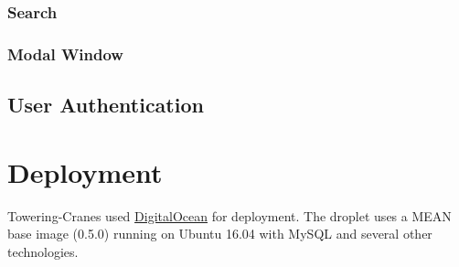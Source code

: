 \documentclass{article}
\begin{document}
\subsubsection{Search}
\subsubsection{Modal Window}

\subsection{User Authentication}

\section{Deployment}
Towering-Cranes used \href{http://www.digitalocean.com/}{DigitalOcean} for deployment. The droplet uses a MEAN base image (0.5.0) running on Ubuntu 16.04 with MySQL and several other technologies.
\end{document}
